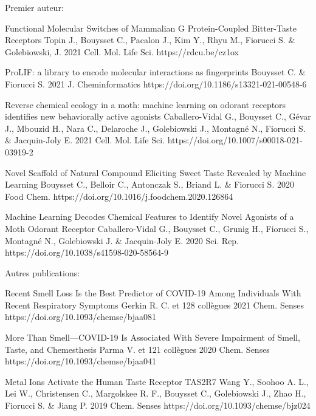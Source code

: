 
\begin{cvpublications}{Premier auteur:}

	{Functional Molecular Switches of Mammalian G Protein-Coupled Bitter-Taste Receptors}
	{Topin J., Bouysset C., Pacalon J., Kim Y., Rhyu M., Fiorucci S. \& Golebiowski, J.}
	{2021}
    {Cell. Mol. Life Sci.}
    {https://rdcu.be/cz1ox}

	{ProLIF: a library to encode molecular interactions as fingerprints}
	{Bouysset C. \& Fiorucci S.}
	{2021}
    {J. Cheminformatics}
    {https://doi.org/10.1186/s13321-021-00548-6}

	{Reverse chemical ecology in a moth: machine learning on odorant receptors identifies new behaviorally active agonists}
	{Caballero-Vidal G., Bouysset C., Gévar J., Mbouzid H., Nara C., Delaroche J., Golebiowski J., Montagné N., Fiorucci S. \& Jacquin-Joly E.}
	{2021}
    {Cell. Mol. Life Sci.}
	{https://doi.org/10.1007/s00018-021-03919-2}

	{Novel Scaffold of Natural Compound Eliciting Sweet Taste Revealed by Machine Learning}
	{Bouysset C., Belloir C., Antonczak S., Briand L. \& Fiorucci S.}
	{2020}
	{Food Chem.}
	{https://doi.org/10.1016/j.foodchem.2020.126864}

	{Machine Learning Decodes Chemical Features to Identify Novel Agonists of a Moth Odorant Receptor}
	{Caballero-Vidal G., Bouysset C., Grunig H., Fiorucci S., Montagné N., Golebiowski J. \& Jacquin-Joly E.}
	{2020}
	{Sci. Rep.}
	{https://doi.org/10.1038/s41598-020-58564-9}

\end{cvpublications}

\begin{cvpublications}{Autres publications:}

	{Recent Smell Loss Is the Best Predictor of COVID-19 Among Individuals With Recent Respiratory Symptoms}
	{Gerkin R. C. et 128 collègues}
    {2021}
	{Chem. Senses}
    {https://doi.org/10.1093/chemse/bjaa081}

	{More Than Smell—COVID-19 Is Associated With Severe Impairment of Smell, Taste, and Chemesthesis}
	{Parma V. et 121 collègues}
    {2020}
	{Chem. Senses}
    {https://doi.org/10.1093/chemse/bjaa041}

	{Metal Ions Activate the Human Taste Receptor TAS2R7}
	{Wang Y., Soohoo A. L., Lei W., Christensen C., Margolskee R. F., Bouysset C., Golebiowski J., Zhao H., Fiorucci S. \& Jiang P.}
    {2019}
	{Chem. Senses}
    {https://doi.org/10.1093/chemse/bjz024}

\end{cvpublications}

